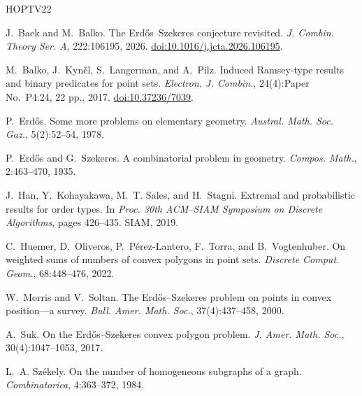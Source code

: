 \documentclass[11pt]{article}
\theoremstyle{remark}
\begin{document}
\small
\begin{thebibliography}{HOPTV22}

J.~Baek and M.~Balko.
The Erd\H{o}s--Szekeres conjecture revisited.
\emph{J. Combin. Theory Ser. A}, 222:106195, 2026.
\href{https://doi.org/10.1016/j.jcta.2026.106195}
{doi:10.1016/j.jcta.2026.106195}.

M.~Balko, J.~Kyn\v{c}l, S.~Langerman, and A.~Pilz.
Induced Ramsey-type results and binary predicates for point sets.
\emph{Electron. J. Combin.}, 24(4):Paper No.~P4.24, 22 pp., 2017.
\href{https://doi.org/10.37236/7039}{doi:10.37236/7039}.

P.~Erd\H{o}s.
Some more problems on elementary geometry.
\emph{Austral. Math. Soc. Gaz.}, 5(2):52--54, 1978.

P.~Erd\H{o}s and G.~Szekeres.
A combinatorial problem in geometry.
\emph{Compos. Math.}, 2:463--470, 1935.

J.~Han, Y.~Kohayakawa, M.~T. Sales, and H.~Stagni.
Extremal and probabilistic results for order types.
In \emph{Proc. 30th ACM--SIAM Symposium on Discrete Algorithms},
pages 426--435. SIAM, 2019.

C.~Huemer, D.~Oliveros, P.~P\'erez-Lantero, F.~Torra, and B.~Vogtenhuber.
On weighted sums of numbers of convex polygons in point sets.
\emph{Discrete Comput. Geom.}, 68:448--476, 2022.

W.~Morris and V.~Soltan.
The Erd\H{o}s--Szekeres problem on points in convex position---a survey.
\emph{Bull. Amer. Math. Soc.}, 37(4):437--458, 2000.

A.~Suk.
On the Erd\H{o}s--Szekeres convex polygon problem.
\emph{J. Amer. Math. Soc.}, 30(4):1047--1053, 2017.

L.~A. Sz\'ekely.
On the number of homogeneous subgraphs of a graph.
\emph{Combinatorica}, 4:363--372, 1984.

\end{thebibliography}
\normalsize
\end{document}
